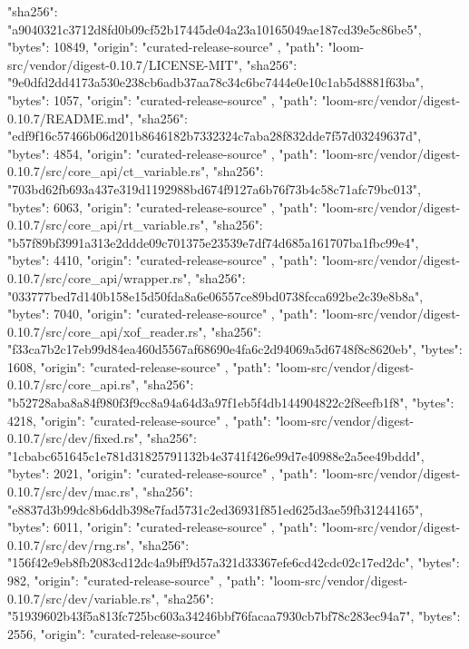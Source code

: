 {{      "sha256": "a9040321c3712d8fd0b09cf52b17445de04a23a10165049ae187cd39e5c86be5",
      "bytes": 10849,
      "origin": "curated-release-source"
    },
    {
      "path": "loom-src/vendor/digest-0.10.7/LICENSE-MIT",
      "sha256": "9e0dfd2dd4173a530e238cb6adb37aa78c34c6bc7444e0e10c1ab5d8881f63ba",
      "bytes": 1057,
      "origin": "curated-release-source"
    },
    {
      "path": "loom-src/vendor/digest-0.10.7/README.md",
      "sha256": "edf9f16c57466b06d201b8646182b7332324c7aba28f832dde7f57d03249637d",
      "bytes": 4854,
      "origin": "curated-release-source"
    },
    {
      "path": "loom-src/vendor/digest-0.10.7/src/core_api/ct_variable.rs",
      "sha256": "703bd62fb693a437e319d1192988bd674f9127a6b76f73b4c58c71afc79bc013",
      "bytes": 6063,
      "origin": "curated-release-source"
    },
    {
      "path": "loom-src/vendor/digest-0.10.7/src/core_api/rt_variable.rs",
      "sha256": "b57f89bf3991a313e2ddde09c701375e23539e7df74d685a161707ba1fbc99e4",
      "bytes": 4410,
      "origin": "curated-release-source"
    },
    {
      "path": "loom-src/vendor/digest-0.10.7/src/core_api/wrapper.rs",
      "sha256": "033777bed7d140b158e15d50fda8a6e06557ce89bd0738fcca692be2c39e8b8a",
      "bytes": 7040,
      "origin": "curated-release-source"
    },
    {
      "path": "loom-src/vendor/digest-0.10.7/src/core_api/xof_reader.rs",
      "sha256": "f33ca7b2c17eb99d84ea460d5567af68690e4fa6c2d94069a5d6748f8c8620eb",
      "bytes": 1608,
      "origin": "curated-release-source"
    },
    {
      "path": "loom-src/vendor/digest-0.10.7/src/core_api.rs",
      "sha256": "b52728aba8a84f980f3f9cc8a94a64d3a97f1eb5f4db144904822c2f8eefb1f8",
      "bytes": 4218,
      "origin": "curated-release-source"
    },
    {
      "path": "loom-src/vendor/digest-0.10.7/src/dev/fixed.rs",
      "sha256": "1cbabc651645c1e781d31825791132b4e3741f426e99d7e40988e2a5ee49bddd",
      "bytes": 2021,
      "origin": "curated-release-source"
    },
    {
      "path": "loom-src/vendor/digest-0.10.7/src/dev/mac.rs",
      "sha256": "e8837d3b99dc8b6ddb398e7fad5731c2ed36931f851ed625d3ae59fb31244165",
      "bytes": 6011,
      "origin": "curated-release-source"
    },
    {
      "path": "loom-src/vendor/digest-0.10.7/src/dev/rng.rs",
      "sha256": "156f42e9eb8fb2083cd12dc4a9bff9d57a321d33367efe6cd42cdc02c17ed2dc",
      "bytes": 982,
      "origin": "curated-release-source"
    },
    {
      "path": "loom-src/vendor/digest-0.10.7/src/dev/variable.rs",
      "sha256": "51939602b43f5a813fc725bc603a34246bbf76facaa7930cb7bf78c283ec94a7",
      "bytes": 2556,
      "origin": "curated-release-source"
}}
